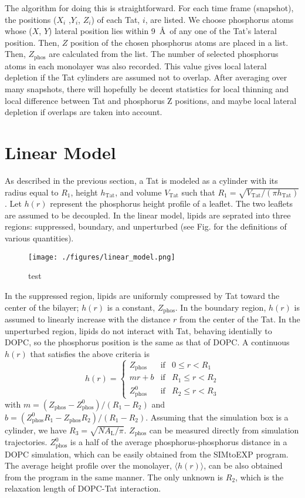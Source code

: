 \documentclass[12pt,letterpaper]{article}
\newcommand{\zphos}{Z_\mathrm{phos}}
\newcommand{\vtat}{V_\mathrm{Tat}}
\newcommand{\htat}{h_\mathrm{Tat}}
\newcommand{\al}{A_\mathrm{L}}
\begin{document}
The algorithm for doing this is straightforward.  For each time frame 
(snapshot), the positions ($X_i$ ,$Y_i$, $Z_i$) of each Tat, $i$, are listed.   
We choose phosphorus atoms whose ($X$, $Y$) lateral position lies within 
9~\AA\ of any one of the Tat's lateral position. Then, $Z$ position
of the chosen phosphorus atoms are placed in a 
list. Then, $\zphos$ are calculated from the list. 
The number of selected phosphorus atoms in each monolayer was also 
recorded. This value gives local lateral depletion if the Tat cylinders 
are assumed not to overlap. After averaging over many snapshots, 
there will hopefully be decent statistics 
for local thinning and local difference between Tat and phosphorus Z positions, 
and maybe local lateral depletion if overlaps are taken into account.  

\section{Linear Model}
As described in the previous section, a Tat is modeled as a cylinder with 
its radius equal to $R_1$, height $\htat$,
and volume $\vtat$ such that $R_1=\sqrt{\vtat/(\pi \htat)}$. 
Let $h(r)$ represent the phosphorus height profile
of a leaflet. The two leaflets are assumed to be decoupled.
In the linear model, lipids are seprated into three regions: 
suppressed, boundary, and unperturbed (see Fig. for the definitions
of various quantities). 
\begin{figure}
  \centering
  \texttt{[image: ./figures/linear\_model.png]}
  \caption{test}
  \label{fig:linear_model}
\end{figure}
In the suppressed region,
lipids are uniformly compressed by Tat toward the center of the bilayer; 
$h(r)$ is a constant, $\zphos$. In the boundary region, $h(r)$ is assumed to 
linearly increase with the distance $r$ from the center of the Tat. In
the unperturbed region, lipids do not interact with Tat, behaving
identially to DOPC, so the phosphorus position is the same as that of 
DOPC. A continuous $h(r)$ that 
satisfies the above criteria is
\begin{equation}
  h(r) = \left\{ 
  \begin{array}{lcr}
    \zphos   & \text{if} & 0   \leq r < R_1 \\
    mr+b     & \text{if} & R_1 \leq r < R_2 \\
    \zphos^0 & \text{if} & R_2 \leq r < R_3 
  \end{array}\right.  
\end{equation}     
with $m=(\zphos-\zphos^0)/(R_1-R_2)$ and $b=(\zphos^0R_1-\zphos R_2)/(R_1-R_2)$. 
Assuming that the simulation box is a cylinder, we have 
$R_3=\sqrt{N\al/\pi}$. $\zphos$ can be measured directly from simulation trajectories.
$\zphos^0$ is a half of the average phosphorus-phosphorus distance in a DOPC simulation,
which can be easily obtained from the SIMtoEXP program. The average height profile over
the monolayer, $\langle h(r) \rangle$, can be also obtained from the program in the same manner. 
The only unknown is $R_2$, which is the relaxation length of DOPC-Tat interaction.
\end{document}
